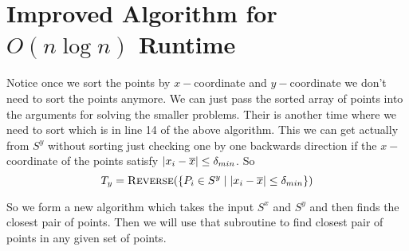 \section{Improved Algorithm for \texorpdfstring{$O(n\log n)$}{O(nlogn)} Runtime}
Notice once we sort the points by $x-$coordinate and $y-$coordinate we don't need to sort the points anymore. We can just pass the sorted array of points into the arguments for solving the smaller problems. Their is another time where we need to sort which is in line 14 of the above algorithm. This we can get actually from $S^y$ without sorting just checking one by one backwards direction if the $x-$coordinate of the points satisfy $|x_i-\overline{x}|\leq \delta_{min}$. So $$T_y=\textsc{Reverse}(\{P_i\in S^y\mid |x_i-\overline{x}|\leq \delta_{min}\})$$

So we form a new algorithm which takes the input $S^x$ and $S^y$ and then finds the closest pair of points. Then we will use that subroutine to find closest pair of points in any given set of points.

